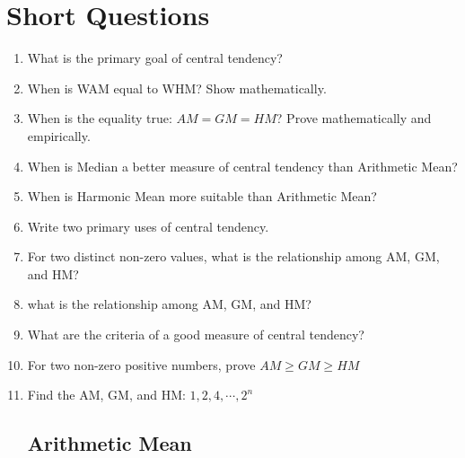 \documentclass[a4paper,oneside]{book}
\begin{document}
\section{Short Questions}

\begin{enumerate}

\subsection{General Questions}

    \item What is the primary goal of central tendency?
    \item When is WAM equal to WHM? Show mathematically.
    \item When is the equality true: $AM=GM=HM$? Prove mathematically and empirically.
    \item When is Median a better measure of central tendency than Arithmetic Mean?
    \item When is Harmonic Mean more suitable than Arithmetic Mean?
    \item Write two primary uses of central tendency.
    \item For two distinct non-zero values, what is the relationship among AM, GM, and HM?
    \item what is the relationship among AM, GM, and HM?
    \item What are the criteria of a good measure of central tendency?
    \item For two non-zero positive numbers, prove $AM \ge GM \ge HM$
    \item Find the AM, GM, and HM: $1,2,4,\cdots, 2^n$

    
\subsection{Arithmetic Mean}


\end{enumerate}
\end{document}
